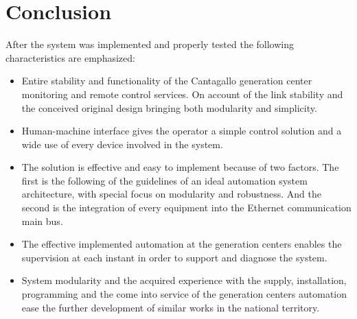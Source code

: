 
\section{Conclusion}

After the system was implemented and properly tested the following characteristics are emphasized:

\begin{itemize}
\item Entire stability and functionality of the Cantagallo generation
  center monitoring and remote control services. On account of the
  link stability and the conceived original design bringing both
  modularity and simplicity.
\item Human-machine interface gives the operator a simple control
  solution and a wide use of every device involved in the system.
\item The solution is effective and easy to implement because of two
  factors. The first is the following of the guidelines of an ideal
  automation system architecture, with special focus on modularity and
  robustness. And the second is the integration of every equipment into
  the Ethernet communication main bus.
\item The effective implemented automation at the generation centers
  enables the supervision at each instant in order to support and
  diagnose the system.
\item System modularity and the acquired experience with the supply,
  installation, programming and the come into service of the generation
  centers automation ease the further development of similar works in
  the national territory.
\end{itemize}
